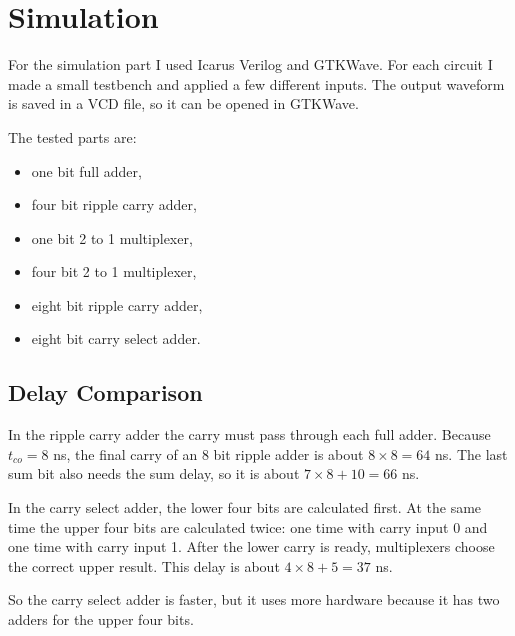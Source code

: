 \section{Simulation}

For the simulation part I used Icarus Verilog and GTKWave.  For each circuit I
made a small testbench and applied a few different inputs.  The output waveform
is saved in a VCD file, so it can be opened in GTKWave.

The tested parts are:
\begin{itemize}
  \item one bit full adder,
  \item four bit ripple carry adder,
  \item one bit 2 to 1 multiplexer,
  \item four bit 2 to 1 multiplexer,
  \item eight bit ripple carry adder,
  \item eight bit carry select adder.
\end{itemize}

\subsection{Delay Comparison}

In the ripple carry adder the carry must pass through each full adder.  Because
$t_{co}=8$ ns, the final carry of an 8 bit ripple adder is about
$8\times 8=64$ ns.  The last sum bit also needs the sum delay, so it is about
$7\times 8+10=66$ ns.

In the carry select adder, the lower four bits are calculated first.  At the same
time the upper four bits are calculated twice: one time with carry input 0 and
one time with carry input 1.  After the lower carry is ready, multiplexers choose
the correct upper result.  This delay is about $4\times 8+5=37$ ns.

So the carry select adder is faster, but it uses more hardware because it has two
adders for the upper four bits.
